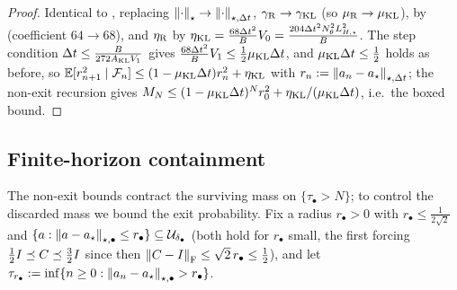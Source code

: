 \begin{proof}
Identical to , replacing $\left\lVert \cdot\right\rVert_\star\to\left\lVert \cdot\right\rVert_{\star,\Delta t}$,
$\gamma_{\mathrm{R}}\to\gamma_{\mathrm{KL}}$ (so $\mu_{\mathrm{R}}\to\mu_{\mathrm{KL}}$),  by
 (coefficient $64\to68$), and $\eta_{\mathrm{R}}$ by
$\eta_{\mathrm{KL}}=\tfrac{68\Delta t^2}BV_0=\tfrac{204\Delta t^2N_\theta^2L_{H,\star}^2}B$. The step condition
$\Delta t\leq\tfrac{B}{272A_{\mathrm{KL}}V_1}$ gives $\tfrac{68\Delta t^2}BV_1\leq\tfrac12\mu_{\mathrm{KL}}\Delta t$, and
$\mu_{\mathrm{KL}}\Delta t\leq\tfrac12$ holds as before, so
$\mathbb{E}[r_{n+1}^2\mid\mathcal{F}_n]\leq(1-\mu_{\mathrm{KL}}\Delta t)r_n^2+\eta_{\mathrm{KL}}$ with $r_n:=\left\lVert a_n-a_\star\right\rVert_{\star,\Delta t}$;
the non-exit recursion gives $M_N\leq(1-\mu_{\mathrm{KL}}\Delta t)^Nr_0^2+\eta_{\mathrm{KL}}/(\mu_{\mathrm{KL}}\Delta t)$, i.e.\ the
boxed bound.
\end{proof}

\subsection{Finite-horizon containment}
\label{subsec:finite-horizon}

The non-exit bounds contract the surviving mass on $\{\tau_\bullet>N\}$; to control the discarded mass
we bound the exit probability. Fix a radius $r_\bullet>0$ with $r_\bullet\leq\tfrac1{2\sqrt2}$ and
$\{a:\left\lVert a-a_\star\right\rVert_{\star,\bullet}\leq r_\bullet\}\subseteq\mathcal{U}_{\delta_\bullet}$ (both hold for
$r_\bullet$ small, the first forcing $\tfrac12I\preceq C\preceq\tfrac32I$ since then
$\left\lVert C-I\right\rVert_{\mathrm{F}}\leq\sqrt2\,r_\bullet\leq\tfrac12$), and let
$\tau_{r_\bullet}:=\inf\{n\geq0:\left\lVert a_n-a_\star\right\rVert_{\star,\bullet}>r_\bullet\}$.

